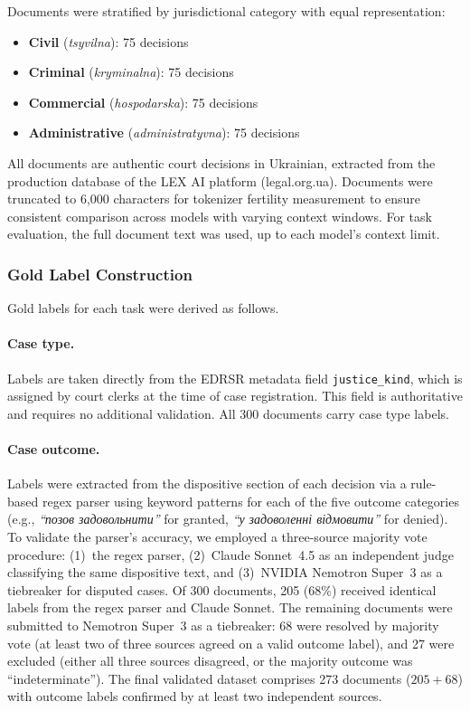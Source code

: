 \documentclass[11pt,a4paper]{article}
\begin{document}
Documents were stratified by jurisdictional category with equal representation:

\begin{itemize}[leftmargin=*]
    \item \textbf{Civil} (\textit{tsyvilna}): 75 decisions
    \item \textbf{Criminal} (\textit{kryminalna}): 75 decisions
    \item \textbf{Commercial} (\textit{hospodarska}): 75 decisions
    \item \textbf{Administrative} (\textit{administratyvna}): 75 decisions
\end{itemize}

All documents are authentic court decisions in Ukrainian, extracted from the production database of the LEX AI platform (legal.org.ua). Documents were truncated to 6,000 characters for tokenizer fertility measurement to ensure consistent comparison across models with varying context windows. For task evaluation, the full document text was used, up to each model's context limit.

\subsubsection{Gold Label Construction}
\label{sec:gold_labels}

Gold labels for each task were derived as follows.

\paragraph{Case type.} Labels are taken directly from the EDRSR metadata field \texttt{justice\_kind}, which is assigned by court clerks at the time of case registration. This field is authoritative and requires no additional validation. All 300 documents carry case type labels.

\paragraph{Case outcome.} Labels were extracted from the dispositive section of each decision via a rule-based regex parser using keyword patterns for each of the five outcome categories (e.g., \foreignlanguage{ukrainian}{\textit{``позов задовольнити''}} for granted, \foreignlanguage{ukrainian}{\textit{``у задоволенні відмовити''}} for denied). To validate the parser's accuracy, we employed a three-source majority vote procedure: (1)~the regex parser, (2)~Claude Sonnet~4.5 as an independent judge classifying the same dispositive text, and (3)~NVIDIA Nemotron Super~3 as a tiebreaker for disputed cases. Of 300 documents, 205 (68\%) received identical labels from the regex parser and Claude Sonnet. The remaining documents were submitted to Nemotron Super~3 as a tiebreaker: 68 were resolved by majority vote (at least two of three sources agreed on a valid outcome label), and 27 were excluded (either all three sources disagreed, or the majority outcome was ``indeterminate''). The final validated dataset comprises 273 documents ($205 + 68$) with outcome labels confirmed by at least two independent sources.
\end{document}
